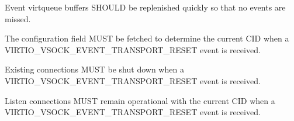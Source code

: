 Event virtqueue buffers SHOULD be replenished quickly so that no events are
missed.

The  configuration field MUST be fetched to determine the
current CID when a VIRTIO_VSOCK_EVENT_TRANSPORT_RESET event is received.

Existing connections MUST be shut down when a
VIRTIO_VSOCK_EVENT_TRANSPORT_RESET event is received.

Listen connections MUST remain operational with the current CID when a
VIRTIO_VSOCK_EVENT_TRANSPORT_RESET event is received.
